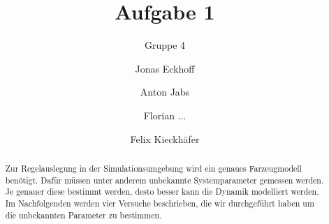 \documentclass[DIV=13]{scrartcl}
\begin{document}
\title{Aufgabe 1}
\subtitle{Gruppe 4}
\author{
  Jonas Eckhoff
  \and
  Anton Jabs
  \and
  Florian ...
  \and
  Felix Kieckhäfer
}

\maketitle

\begin{abstract}
Zur Regelauslegung in der Simulationsumgebung wird ein genaues Farzeugmodell benötigt. Dafür müssen unter anderem unbekannte Systemparameter gemessen werden. Je genauer diese bestimmt werden, desto besser kann die Dynamik modelliert werden. Im Nachfolgenden werden vier Versuche beschrieben, die wir durchgeführt haben um die unbekannten Parameter zu bestimmen. 
\end{abstract}







\end{document}
